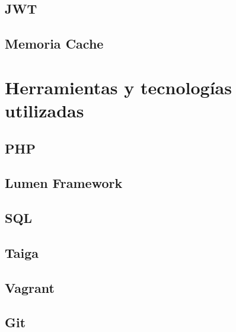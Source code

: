 \subsection{JWT}

\subsection{Memoria Cache}


\section{Herramientas y tecnologías utilizadas}

\subsection{PHP}

\subsection{Lumen Framework}

\subsection{SQL}

\subsection{Taiga}

\subsection{Vagrant}

\subsection{Git}